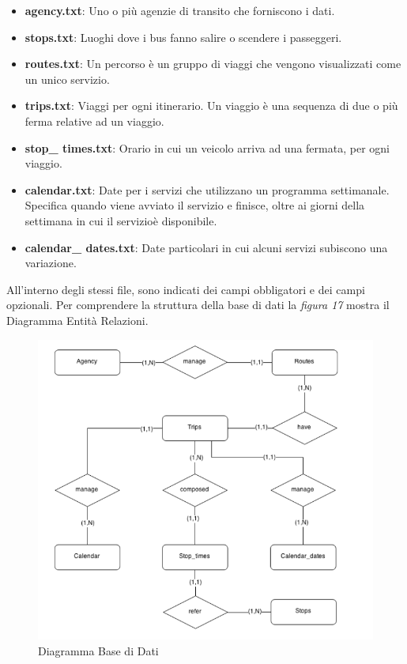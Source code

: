 \begin{itemize}
\item {\bf{agency.txt}}: Uno o pi\`{u} agenzie di transito che forniscono i dati.\\
\item {\bf{stops.txt}}: Luoghi dove i bus fanno salire o scendere i passeggeri.\\
\item {\bf{routes.txt}}: Un percorso \`{e} un gruppo di viaggi che vengono visualizzati come un unico servizio.\\
\item {\bf{trips.txt}}: Viaggi per ogni itinerario. Un viaggio \`{e} una sequenza di due o pi\`{u} ferma relative ad un viaggio.\\
\item {\bf{stop\_ times.txt}}: Orario in cui un veicolo arriva ad una fermata, per ogni viaggio.\\
\item {\bf{calendar.txt}}: Date per i servizi che utilizzano un programma settimanale. Specifica quando viene avviato il servizio e finisce, oltre ai giorni della settimana in cui il servizio\`{e} disponibile.\\
\item {\bf{calendar\_ dates.txt}}: Date particolari in cui alcuni servizi subiscono una variazione.\\
\end{itemize}
All\rq interno degli stessi file, sono indicati dei campi obbligatori e dei campi opzionali.
Per comprendere la struttura della base di dati la \emph{figura 17} mostra il Diagramma Entit\`{a} Relazioni.



\begin{figure}[h]
\centering
\includegraphics[scale=.4]{img/ER.png}
\caption{Diagramma Base di Dati}
\label{fig:ER}
\end{figure}

